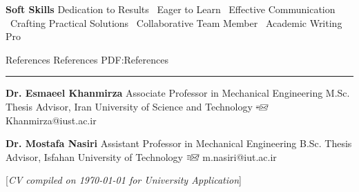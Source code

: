 \documentclass[letterpaper,MMMyyyy]{CVTemplate}
\newcommand{\CVNote}{CV compiled on {\today} for University Application}
\begin{document}
\begin{Body}
\vspace{6pt}
\BulletItem
\textbf{Soft Skills}
\newline
Dedication to Results 
\textbullet\ Eager to Learn 
\textbullet\ Effective Communication 
\textbullet\ Crafting Practical Solutions 
\textbullet\ Collaborative Team Member
\textbullet\ Academic Writing Pro

%
%



\Section
{References}
{References}
{PDF:References}
\textcolor{Forestg}{\vspace{0.10cm}\hrule height 0.1cm}\BigGap\Gap
\BulletItem
\textbf{Dr. Esmaeel Khanmirza}
\newline
Associate Professor in Mechanical Engineering
\newline
M.Sc. Thesis Advisor, Iran University of Science and Technology
\newline
\includegraphics[height=7pt]{icons/SendEmail.png} Khanmirza@iust.ac.ir

\BigGap
\BulletItem
\textbf{Dr. Mostafa Nasiri}
\newline
Assistant Professor in Mechanical Engineering
\newline
B.Sc. Thesis Advisor, Isfahan University of Technology
\newline
\includegraphics[height=7pt]{icons/SendEmail.png} m.nasiri@iut.ac.ir

\end{Body}


\UseNoteFont%
\hfill%
[\textit{\CVNote}]
\end{document}
